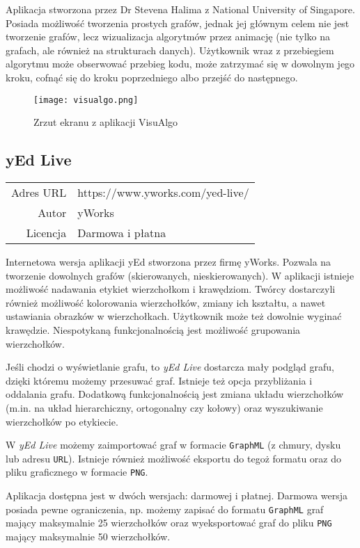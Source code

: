 Aplikacja stworzona przez Dr Stevena Halima z National University of Singapore. Posiada możliwość tworzenia prostych grafów, jednak jej głównym celem nie jest tworzenie grafów, lecz wizualizacja algorytmów przez animację (nie tylko na grafach, ale również na strukturach danych). Użytkownik wraz z przebiegiem algorytmu może obserwować przebieg kodu, może zatrzymać się w dowolnym jego kroku, cofnąć się do kroku poprzedniego albo przejść do następnego.

\begin{figure}[H]
\caption{Zrzut ekranu z aplikacji VisuAlgo}
\centering
\texttt{[image: visualgo.png]}
\end{figure}

\subsection*{yEd Live}
\bigskip
\noindent\begin{tabularx}{\textwidth}{r|X|}
\cline{2-2}
  Adres URL & https://www.yworks.com/yed-live/ \\ 
\cline{2-2} 
 Autor & yWorks\\ 
\cline{2-2}
 Licencja & Darmowa i płatna\\ 
\cline{2-2}
\end{tabularx}
\bigskip

Internetowa wersja aplikacji yEd stworzona przez firmę yWorks. Pozwala na tworzenie dowolnych grafów (skierowanych, nieskierowanych). W aplikacji istnieje możliwość nadawania etykiet wierzchołkom i krawędziom. Twórcy dostarczyli również możliwość kolorowania wierzchołków, zmiany ich kształtu, a nawet ustawiania obrazków w wierzchołkach. Użytkownik może też dowolnie wyginać krawędzie. Niespotykaną funkcjonalnością jest możliwość grupowania wierzchołków. 

Jeśli chodzi o wyświetlanie grafu, to \textit{yEd Live} dostarcza mały podgląd grafu, dzięki któremu możemy przesuwać graf. Istnieje też opcja przybliżania i oddalania grafu. Dodatkową funkcjonalnością jest zmiana układu wierzchołków (m.in. na układ hierarchiczny, ortogonalny czy kołowy) oraz wyszukiwanie wierzchołków po etykiecie.

W \textit{yEd Live} możemy zaimportować graf w formacie \texttt{GraphML} (z chmury, dysku lub adresu \texttt{URL}). Istnieje również możliwość eksportu do tegoż formatu oraz do pliku graficznego w formacie \texttt{PNG}. 

Aplikacja dostępna jest w dwóch wersjach: darmowej i płatnej. Darmowa wersja posiada pewne ograniczenia, np. możemy zapisać do formatu \texttt{GraphML} graf mający maksymalnie 25 wierzchołków oraz wyeksportować graf do pliku \texttt{PNG} mający maksymalnie 50 wierzchołków. 

